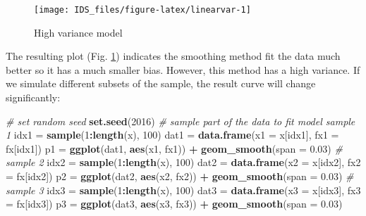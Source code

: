\documentclass[12pt,]{krantz}
\makeatletter
\newenvironment{Shaded}{\begin{snugshade}}{\end{snugshade}}
\newcommand{\KeywordTok}[1]{\textcolor[rgb]{0.27,0.27,0.27}{\textbf{#1}}}
\newcommand{\DataTypeTok}[1]{\textcolor[rgb]{0.27,0.27,0.27}{#1}}
\newcommand{\DecValTok}[1]{\textcolor[rgb]{0.06,0.06,0.06}{#1}}
\newcommand{\FloatTok}[1]{\textcolor[rgb]{0.06,0.06,0.06}{#1}}
\newcommand{\StringTok}[1]{\textcolor[rgb]{0.5,0.5,0.5}{#1}}
\newcommand{\CommentTok}[1]{\textcolor[rgb]{0.37,0.37,0.37}{\textit{#1}}}
\newcommand{\OperatorTok}[1]{\textcolor[rgb]{0.43,0.43,0.43}{\textbf{#1}}}
\newcommand{\NormalTok}[1]{#1}
\newenvironment{kframe}{%
\medskip{}
\setlength{\fboxsep}{.8em}
 \def\at@end@of@kframe{}%
 \ifinner\ifhmode%
  \def\at@end@of@kframe{\end{minipage}}%
  \begin{minipage}{\columnwidth}%
 \fi\fi%
 \def\FrameCommand##1{\hskip\@totalleftmargin \hskip-\fboxsep
 \colorbox{shadecolor}{##1}\hskip-\fboxsep
     \hskip-\linewidth \hskip-\@totalleftmargin \hskip\columnwidth}%
 \MakeFramed {\advance\hsize-\width
   \@totalleftmargin\z@ \linewidth\hsize
   \@setminipage}}%
 {\par\unskip\endMakeFramed%
 \at@end@of@kframe}
\renewenvironment{Shaded}{\begin{kframe}}{\end{kframe}}
\theoremstyle{definition}
\theoremstyle{definition}
\theoremstyle{definition}
\theoremstyle{remark}
\makeatother
\begin{document}
\begin{figure}

{\centering \texttt{[image: IDS\_files/figure-latex/linearvar-1]} 

}

\caption{High variance model}\label{fig:linearvar}
\end{figure}

The resulting plot (Fig. \ref{fig:linearvar}) indicates the smoothing
method fit the data much better so it has a much smaller bias. However,
this method has a high variance. If we simulate different subsets of the
sample, the result curve will change significantly:

\begin{Shaded}
\begin{Highlighting}[]
\CommentTok{# set random seed}
\KeywordTok{set.seed}\NormalTok{(}\DecValTok{2016}\NormalTok{)}
\CommentTok{# sample part of the data to fit model sample 1}
\NormalTok{idx1 =}\StringTok{ }\KeywordTok{sample}\NormalTok{(}\DecValTok{1}\OperatorTok{:}\KeywordTok{length}\NormalTok{(x), }\DecValTok{100}\NormalTok{)}
\NormalTok{dat1 =}\StringTok{ }\KeywordTok{data.frame}\NormalTok{(}\DataTypeTok{x1 =}\NormalTok{ x[idx1], }\DataTypeTok{fx1 =}\NormalTok{ fx[idx1])}
\NormalTok{p1 =}\StringTok{ }\KeywordTok{ggplot}\NormalTok{(dat1, }\KeywordTok{aes}\NormalTok{(x1, fx1)) }\OperatorTok{+}\StringTok{ }\KeywordTok{geom_smooth}\NormalTok{(}\DataTypeTok{span =} \FloatTok{0.03}\NormalTok{)}
\CommentTok{# sample 2}
\NormalTok{idx2 =}\StringTok{ }\KeywordTok{sample}\NormalTok{(}\DecValTok{1}\OperatorTok{:}\KeywordTok{length}\NormalTok{(x), }\DecValTok{100}\NormalTok{)}
\NormalTok{dat2 =}\StringTok{ }\KeywordTok{data.frame}\NormalTok{(}\DataTypeTok{x2 =}\NormalTok{ x[idx2], }\DataTypeTok{fx2 =}\NormalTok{ fx[idx2])}
\NormalTok{p2 =}\StringTok{ }\KeywordTok{ggplot}\NormalTok{(dat2, }\KeywordTok{aes}\NormalTok{(x2, fx2)) }\OperatorTok{+}\StringTok{ }\KeywordTok{geom_smooth}\NormalTok{(}\DataTypeTok{span =} \FloatTok{0.03}\NormalTok{)}
\CommentTok{# sample 3}
\NormalTok{idx3 =}\StringTok{ }\KeywordTok{sample}\NormalTok{(}\DecValTok{1}\OperatorTok{:}\KeywordTok{length}\NormalTok{(x), }\DecValTok{100}\NormalTok{)}
\NormalTok{dat3 =}\StringTok{ }\KeywordTok{data.frame}\NormalTok{(}\DataTypeTok{x3 =}\NormalTok{ x[idx3], }\DataTypeTok{fx3 =}\NormalTok{ fx[idx3])}
\NormalTok{p3 =}\StringTok{ }\KeywordTok{ggplot}\NormalTok{(dat3, }\KeywordTok{aes}\NormalTok{(x3, fx3)) }\OperatorTok{+}\StringTok{ }\KeywordTok{geom_smooth}\NormalTok{(}\DataTypeTok{span =} \FloatTok{0.03}\NormalTok{)}

\end{Highlighting}
\end{Shaded}
\end{document}
